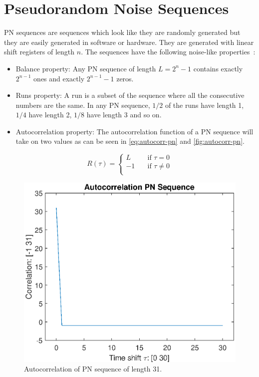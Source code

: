 
\section{Pseudorandom Noise Sequences}
\label{sec:pn-sequences}

PN sequences are sequences which look like they are randomly generated but they are easily generated in software or hardware.
They are generated with linear shift registers of length $n$.
The sequences have the following noise-like properties~\cite{mitra2008pseudo}:

\begin{itemize}
	\item Balance property:	Any PN sequence of length $L = 2^n - 1$ contains exactly $2^{n-1}$ ones and exactly $2^{n-1} - 1$ zeros.

	\item Runs property: A run is a subset of the sequence where all the consecutive numbers are the same. In any PN sequence, $1/2$ of the runs have length 1, $1/4$ have length 2, $1/8$ have length 3 and so on.

	\item Autocorrelation property: The autocorrelation function of a PN sequence will take on two values as can be seen in \autoref{eq:autocorr-pn} and \autoref{fig:autocorr-pn}.


\end{itemize}

\begin{equation}
	\label{eq:autocorr-pn}
	R(\tau) = 
		\begin{cases}
			L    & \quad \text{if } \tau = 0 \\
			-1   & \quad \text{if } \tau \neq 0 \\
		\end{cases}
\end{equation}

\begin{figure}[t]
	\centering
	\includegraphics[width=\textwidth]{chapters/cdma-chapters/autocorr-pn.eps}
	\caption{Autocorrelation of PN sequence of length 31.}
	\label{fig:autocorr-pn}
\end{figure}


